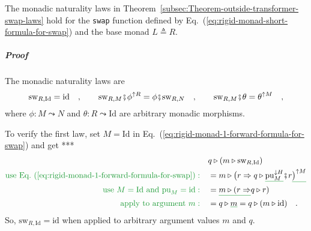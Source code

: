 The monadic naturality laws in Theorem~\ref{subsec:Theorem-outside-transformer-swap-laws}
hold for the \lstinline!swap!
function defined by Eq.~(\ref{eq:rigid-monad-short-formula-for-swap})
and the base monad $L\triangleq R$.

\subparagraph{Proof}

The monadic naturality laws are 
\[
\text{sw}_{R,\text{Id}}=\text{id}\quad,\quad\quad\text{sw}_{R,M}\bef\phi^{\uparrow R}=\phi\bef\text{sw}_{R,N}\quad,\quad\quad\text{sw}_{R,M}\bef\theta=\theta^{\uparrow M}\quad,
\]
where $\phi:M\leadsto N$ and $\theta:R\leadsto\text{Id}$ are arbitrary
monadic morphisms. %
\begin{comment}
Eq.~(\ref{eq:rigid-monad-swap-derivation2}) gives
\[
\text{sw}_{R,M}(m)=q\Rightarrow m\triangleright\big(\text{pu}_{M}^{\uparrow R}\bef(x\Rightarrow x\,q)\big)^{\uparrow M}\bef\text{ftn}_{M}
\]
\end{comment}

To verify the first law, set $M=\text{Id}$ in Eq.~(\ref{eq:rigid-monad-1-forward-formula-for-swap})
and get {*}{*}{*}
\begin{align*}
 & q\triangleright(m\triangleright\text{sw}_{R,\text{Id}})\\
{\color{greenunder}\text{use Eq.~(\ref{eq:rigid-monad-1-forward-formula-for-swap})}:}\quad & =m\triangleright\big(r\Rightarrow q\triangleright\gunderline{\text{pu}_{M}^{\downarrow H}}\bef r\gunderline{\big)^{\uparrow M}}\\
{\color{greenunder}\text{use }M=\text{Id}\text{ and }\text{pu}_{M}=\text{id}:}\quad & =\gunderline{m\triangleright(r\Rightarrow}q\triangleright r)\\
{\color{greenunder}\text{apply to argument }m:}\quad & =q\triangleright\gunderline m=q\triangleright(m\triangleright\text{id})\quad.
\end{align*}
So, $\text{sw}_{R,\text{Id}}=\text{id}$ when applied to arbitrary
argument values $m$ and $q$.

